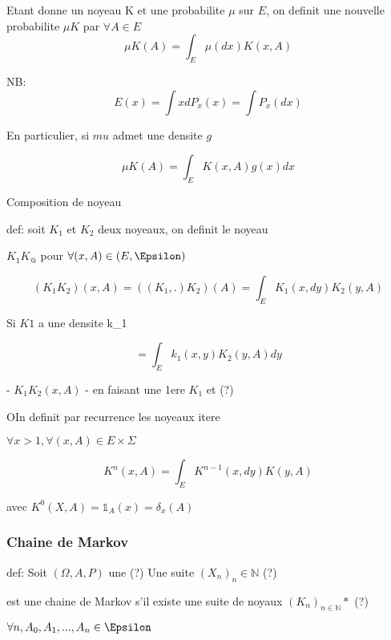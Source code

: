 \documentclass{article}
\begin{document}
Etant donne un noyeau K et une probabilite $\mu$ sur $E$, on definit une nouvelle probabilite $\mu K$ par $\forall A \in E$
\begin{equation}

\mu K(A) = \int_E \mu (dx) K(x,A)
\end{equation}

NB: 
\begin{equation}
E(x) = \int x dP_x(x) = \int P_x(dx)
\end{equation}

En particulier, si $mu$ admet une densite $g$

\begin{equation}
\mu K(A) = \int_E K(x,A) g(x) dx
\end{equation}

Composition de noyeau

def: soit $K_1$ et $K_2$ deux noyeaux, on definit le  noyeau

$K_1 K_@$ pour $\forall (x,A)\in (E,\Epsilon)$

\begin{equation}
(K_1 K_2)(x,A) = ((K_1,.)K_2)(A)=\int_E K_1(x,dy)K_2(y,A)
\end{equation}

Si $K1$ a une densite k_1

\begin{equation}
=\int_E k_1(x,y)K_2(y,A)dy
\end{equation}

- $K_1K_2(x,A)$ 
- en faisant une 1ere $K_1$ et (?)

OIn definit par recurrence les noyeaux itere

$\forall x > 1, \forall (x,A) \in E \times \Sigma$


\begin{equation}
K^n(x,A) =\int_E K^{n-1}(x,dy)K(y,A)
\end{equation}

avec $K^0(X,A)= \mathbb{1}_A(x)=\delta_x(A)$

\subsubsection{Chaine de Markov}

def: Soit $(\Omega, A,P)$ une (?)
Une suite $(X_n)_n\in \mathbb{N}$ (?)

est une chaine de Markov s'il existe une suite de noyaux $(K_n)_{n\in \mathbb{N}}*$ (?)

$\forall n,A_0,A_1, ... ,A_n \in \Epsilon$
\end{document}
